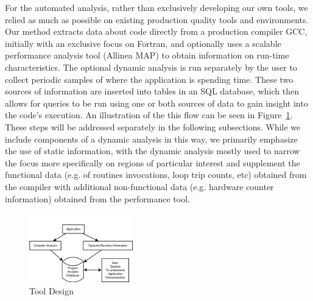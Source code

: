 For the automated analysis, rather than exclusively developing our own tools, we relied as much as possible on existing production quality tools and environments.
Our method extracts data about code directly from a production compiler \ac{GCC}, initially with an exclusive focus on Fortran, and optionally uses a scalable performance analysis tool (Allinea MAP) to obtain information on run-time characteristics.
The optional dynamic analysis is run separately by the user to collect periodic samples of where the application is spending time.
These two sources of information are inserted into tables in an \acs{SQL} database, which then allows for queries to be run using one or both sources of data to gain insight into the code's execution.
An illustration of the this flow can be seen in Figure~\ref{fig:design}.
These steps will be addressed separately in the following subsections.
While we include components of a dynamic analysis in this way, we primarily emphasize the use of static information, with the dynamic analysis mostly used to narrow the focus more specifically on regions of particular interest and supplement the functional data (e.g. of routines invocations, loop trip counts, etc) obtained from the compiler with additional non-functional data (e.g. hardware counter information) obtained from the performance tool.

\begin{figure}
\begin{center}
\includegraphics[width=0.4\textwidth]{images/design.png}
\end{center}
\caption{Tool Design}
\label{fig:design}
\end{figure}

